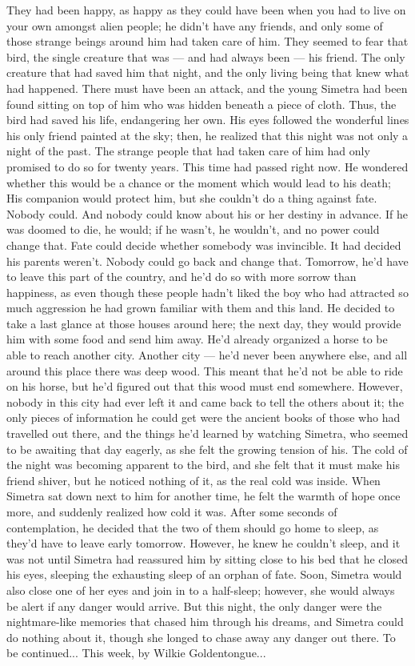 They had been happy, as happy as they could have been when you had to live on your own amongst alien people; he didn't have any friends, and only some of those strange beings around him had taken care of him. They seemed to fear that bird, the single creature that was --- and had always been --- his friend. 
The only creature that had saved him that night, and the only living being that knew what had happened. There must have been an attack, and the young Simetra had been found sitting on top of him who was hidden beneath a piece of cloth. Thus, the bird had saved his life, endangering her own. 
His eyes followed the wonderful lines his only friend painted at the sky; then, he realized that this night was not only a night of the past. 
The strange people that had taken care of him had only promised to do so for twenty years. 
This time had passed right now. 
He wondered whether this would be a chance or the moment which would lead to his death; His companion would protect him, but she couldn't do a thing against fate. 
Nobody could. 
And nobody could know about his or her destiny in advance. 
If he was doomed to die, he would; if he wasn't, he wouldn't, and no power could change that. 
Fate could decide whether somebody was invincible. It had decided his parents weren't. 
Nobody could go back and change that. 
Tomorrow, he'd have to leave this part of the country, and he'd do so with more sorrow than happiness, as even though these people hadn't liked the boy who had attracted so much aggression he had grown familiar with them and this land. 
He decided to take a last glance at those houses around here; the next day, they would provide him with some food and send him away. He'd already organized a horse to be able to reach another city. 
Another city --- he'd never been anywhere else, and all around this place there was deep wood. This meant that he'd not be able to ride on his horse, but he'd figured out that this wood must end somewhere. However, nobody in this city had ever left it and came back to tell the others about it; the only pieces of information he could get were the ancient books of those who had travelled out there, and the things he'd learned by watching Simetra, who seemed to be awaiting that day eagerly, as she felt the growing tension of his. 
The cold of the night was becoming apparent to the bird, and she felt that it must make his friend shiver, but he noticed nothing of it, as the real cold was inside. When Simetra sat down next to him for another time, he felt the warmth of hope once more, and suddenly realized how cold it was. After some seconds of contemplation, he decided that the two of them should go home to sleep, as they'd have to leave early tomorrow. 
However, he knew he couldn't sleep, and it was not until Simetra had reassured him by sitting close to his bed that he closed his eyes, sleeping the exhausting sleep of an orphan of fate. 
Soon, Simetra would also close one of her eyes and join in to a half-sleep; however, she would always be alert if any danger would arrive. 
But this night, the only danger were the nightmare-like memories that chased him through his dreams, and Simetra could do nothing about it, though she longed to chase away any danger out there. 
To be continued...
This week, by Wilkie Goldentongue...

